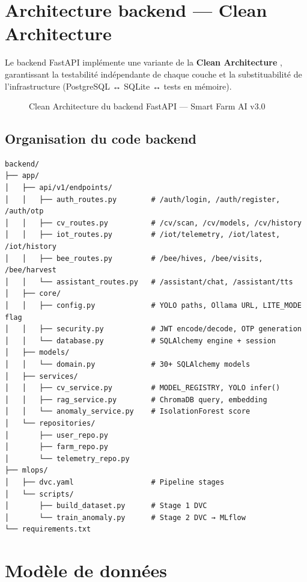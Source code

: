 \section{Architecture backend — Clean Architecture}

Le backend FastAPI implémente une variante de la \textbf{Clean Architecture}
\cite{fastapi2023}, garantissant la testabilité indépendante de chaque couche et
la substituabilité de l'infrastructure (PostgreSQL ↔ SQLite ↔ tests en mémoire).

\begin{figure}[H]
\centering
\resizebox{\textwidth}{!}{%

}
\caption{Clean Architecture du backend FastAPI — Smart Farm AI v3.0}
\label{fig:clean_archi}
\end{figure}

\subsection{Organisation du code backend}

\begin{lstlisting}[style=pythonstyle, caption={Structure du projet backend FastAPI}, label={lst:backend_struct}]
backend/
├── app/
│   ├── api/v1/endpoints/
│   │   ├── auth_routes.py        # /auth/login, /auth/register, /auth/otp
│   │   ├── cv_routes.py          # /cv/scan, /cv/models, /cv/history
│   │   ├── iot_routes.py         # /iot/telemetry, /iot/latest, /iot/history
│   │   ├── bee_routes.py         # /bee/hives, /bee/visits, /bee/harvest
│   │   └── assistant_routes.py   # /assistant/chat, /assistant/tts
│   ├── core/
│   │   ├── config.py             # YOLO paths, Ollama URL, LITE_MODE flag
│   │   ├── security.py           # JWT encode/decode, OTP generation
│   │   └── database.py           # SQLAlchemy engine + session
│   ├── models/
│   │   └── domain.py             # 30+ SQLAlchemy models
│   ├── services/
│   │   ├── cv_service.py         # MODEL_REGISTRY, YOLO infer()
│   │   ├── rag_service.py        # ChromaDB query, embedding
│   │   └── anomaly_service.py    # IsolationForest score
│   └── repositories/
│       ├── user_repo.py
│       ├── farm_repo.py
│       └── telemetry_repo.py
├── mlops/
│   ├── dvc.yaml                  # Pipeline stages
│   └── scripts/
│       ├── build_dataset.py      # Stage 1 DVC
│       └── train_anomaly.py      # Stage 2 DVC → MLflow
└── requirements.txt
\end{lstlisting}

\section{Modèle de données}

